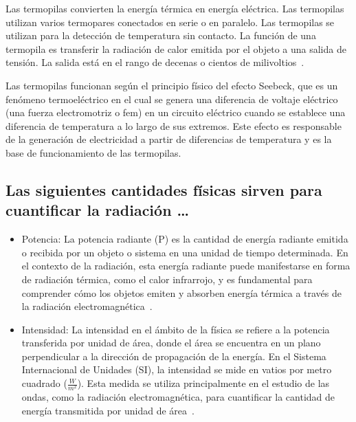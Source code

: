 \documentclass[twocolumn, 12pt]{article}
\begin{document}
Las termopilas convierten la energía térmica en energía
eléctrica. Las termopilas utilizan varios termopares
conectados en serie o en paralelo. Las termopilas se
utilizan para la detección de temperatura sin contacto. La
función de una termopila es transferir la radiación de
calor emitida por el objeto a una salida de tensión. La
salida está en el rango de decenas o cientos de
milivoltios~\cite{Termopilas}.

Las termopilas funcionan según el principio físico del
efecto Seebeck, que es un fenómeno termoeléctrico en el
cual se genera una diferencia de voltaje eléctrico (una
fuerza electromotriz o fem) en un circuito eléctrico cuando
se establece una diferencia de temperatura a lo largo de
sus extremos. Este efecto es responsable de la generación
de electricidad a partir de diferencias de temperatura y es
la base de funcionamiento de las termopilas.

\subsection{Las siguientes cantidades físicas sirven para cuantificar la radiación \dots}

\begin{itemize}[label=$\triangleright$]
      \item Potencia: La potencia radiante (P) es la cantidad de
            energía radiante emitida o recibida por un objeto o sistema
            en una unidad de tiempo determinada. En el contexto de la
            radiación, esta energía radiante puede manifestarse en
            forma de radiación térmica, como el calor infrarrojo, y es
            fundamental para comprender cómo los objetos emiten y
            absorben energía térmica a través de la radiación
            electromagnética~\cite{Potencia}.

      \item Intensidad: La intensidad en el ámbito de la física se
            refiere a la potencia transferida por unidad de área, donde
            el área se encuentra en un plano perpendicular a la
            dirección de propagación de la energía. En el Sistema
            Internacional de Unidades (SI), la intensidad se mide en
            vatios por metro cuadrado ($\frac{W}{m^2}$). Esta medida se
            utiliza principalmente en el estudio de las ondas, como la
            radiación electromagnética, para cuantificar la cantidad de
            energía transmitida por unidad de área~\cite{Intensidad}.
\end{itemize}
\end{document}
